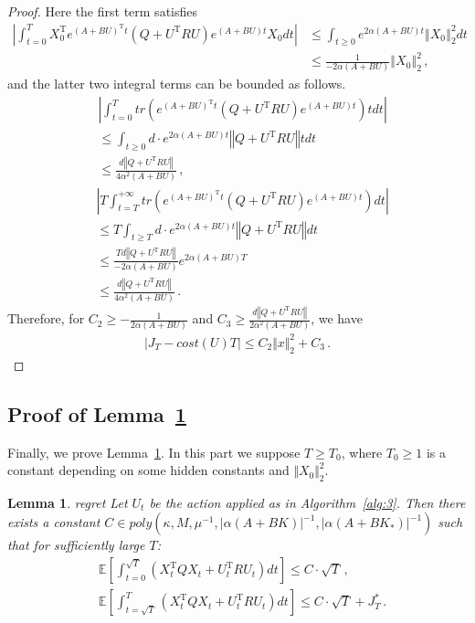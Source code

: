 \documentclass{article}
\newtheorem{lemma}[theorem]{Lemma}
\theoremstyle{definition}
\begin{document}
\begin{proof}
Here the first term satisfies
\begin{align*}
\left\vert\int_{t=0}^{T}X_{0}^{\mathrm{T}}e^{(A+BU)^{\mathrm{T}}t}(Q+U^{\mathrm{T}}RU)e^{(A+BU)t}X_{0}dt\right\vert&\leq \int_{t\geq 0}e^{2\alpha(A+BU)t}\left\Vert X_{0}\right\Vert ^{2}_{2}dt\\
&\leq\frac{1}{-2\alpha(A+BU)}\left\Vert X_{0}\right\Vert ^{2}_{2}\,,
\end{align*}
and the latter two integral terms can be bounded as follows.
\begin{align*}
&\left\vert\int_{t=0}^{T}tr\left(e^{(A+BU)^{\mathrm{T}}t}(Q+U^{\mathrm{T}}RU)e^{(A+BU)t}\right)tdt\right\vert\\
&\leq \int_{t\geq 0}d\cdot e^{2\alpha(A+BU)t}\left\Vert Q+U^{\mathrm{T}}RU\right\Vert tdt\\
&\leq \frac{d\left\Vert Q+U^{\mathrm{T}}RU\right\Vert }{4\alpha^{2}(A+BU)}\,,
\end{align*}
\begin{align*}
&\left\vert T\int_{t=T}^{+\infty}tr\left(e^{(A+BU)^{\mathrm{T}}t}(Q+U^{\mathrm{T}}RU)e^{(A+BU)t}\right)dt\right\vert\\
&\leq T\int_{t\geq T}d\cdot e^{2\alpha(A+BU)t}\left\Vert Q+U^{\mathrm{T}}RU\right\Vert dt\\
&\leq \frac{Td\left\Vert Q+U^{\mathrm{T}}RU\right\Vert }{-2\alpha(A+BU)}e^{2\alpha(A+BU)T}\\
&\leq \frac{d\left\Vert Q+U^{\mathrm{T}}RU\right\Vert }{4\alpha^{2}(A+BU)}\,.
\end{align*}
Therefore, for $C_{2}\geq -\frac{1}{2\alpha(A+BU)}$ and $C_{3}\geq \frac{d\left\Vert Q+U^{\mathrm{T}}RU\right\Vert }{2\alpha^{2}(A+BU)}$, we have
\begin{align*}
\left\vert J_{T}-cost(U)T\right\vert \leq C_{2}\Vert x\Vert ^{2}_{2}+C_{3}\,.
\end{align*}
\end{proof}


\subsection{Proof of Lemma~\ref{lem:estimating expected cost}}
\label{app:final}
Finally, we prove Lemma~\ref{lem:estimating expected cost}. In this part we suppose $T\geq T_{0}$, where $T_{0}\geq 1$ is a constant depending on some hidden constants and $\Vert X_{0}\Vert^{2}_{2}$. 

\begin{lemma}{regret}
\label{lem:estimating expected cost}
Let $U_{t}$ be the action applied as in Algorithm~\ref{alg:3}. Then there exists a constant $C\in poly(\kappa,M, \mu^{-1}, \vert\alpha(A+BK)\vert^{-1},  \vert\alpha(A+BK_{*})\vert^{-1})$ such that for sufficiently large $T$:
\begin{align*}
&\mathbb{E}\left[\int_{t=0}^{\sqrt{T}}\left(X^{\mathrm{T}}_{t}QX_{t}+U^{\mathrm{T}}_{t}RU_{t}\right)dt \right]\leq C\cdot \sqrt{T}\,,\\   
&\mathbb{E}\left[\int_{t=\sqrt{T}}^{T}\left(X^{\mathrm{T}}_{t}QX_{t}+U^{\mathrm{T}}_{t}RU_{t}\right)dt \right]\leq C\cdot \sqrt{T}+J^{*}_{T}\,.   
\end{align*}
\end{lemma}
\end{document}
